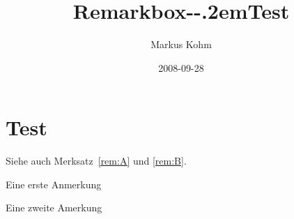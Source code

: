\documentclass{scrartcl}
\begin{document}
\title{Remarkbox-\kern-.2emTest}
\author{Markus Kohm}
\date{2008-09-28}
\maketitle
\listofremarkboxes
\section{Test}
Siehe auch Merksatz~\ref{rem:A} und \ref{rem:B}.
\lipsum[1-4]
\begin{remarkbox}
\centering
{}
\caption{Eine erste Anmerkung}
\label{rem:A}
\end{remarkbox}
\lipsum[5-6]
\begin{remarkbox}
\centering
{}
\caption{Eine zweite Amerkung}
\label{rem:B}
\end{remarkbox}
\lipsum
\end{document}
